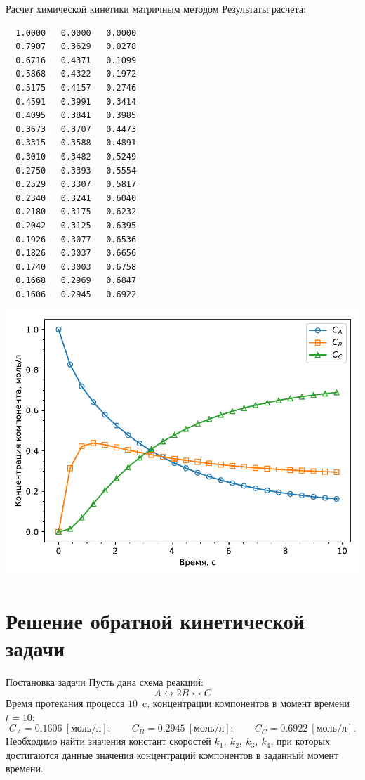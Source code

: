 \documentclass[aspectratio=169, mathserif]{beamer}	%
\begin{document}
\begin{frame}[fragile, label=c]{Расчет химической кинетики матричным методом}
\scriptsize
Результаты расчета:
\vfill
\begin{minipage}{.35\textwidth}
\begin{verbatim}
  1.0000   0.0000   0.0000
  0.7907   0.3629   0.0278
  0.6716   0.4371   0.1099
  0.5868   0.4322   0.1972
  0.5175   0.4157   0.2746
  0.4591   0.3991   0.3414
  0.4095   0.3841   0.3985
  0.3673   0.3707   0.4473
  0.3315   0.3588   0.4891
  0.3010   0.3482   0.5249
  0.2750   0.3393   0.5554
  0.2529   0.3307   0.5817
  0.2340   0.3241   0.6040
  0.2180   0.3175   0.6232
  0.2042   0.3125   0.6395
  0.1926   0.3077   0.6536
  0.1826   0.3037   0.6656
  0.1740   0.3003   0.6758
  0.1668   0.2969   0.6847
  0.1606   0.2945   0.6922
\end{verbatim}
\end{minipage}
\begin{minipage}{.64\textwidth}
\includegraphics[width=\linewidth]{./pics/fig}
\end{minipage}
\vfill
\end{frame}


\section{Решение обратной кинетической задачи}
\sectionframe

\begin{frame}[fragile, label=c]{Постановка задачи}
\scriptsize
Пусть дана схема реакций:
\vfill
$$
	A \longleftrightarrow 2B \longleftrightarrow C
$$
\vfill
Время протекания процесса $10$~$\mathrm{c}$, концентрации компонентов в момент времени $t = 10$:
\vfill
$$
	C_A = 0.1606 \ \left[\mathrm{моль/л}\right]; \qquad C_B = 0.2945 \ \left[\mathrm{моль/л}\right]; \qquad C_C = 0.6922 \ \left[\mathrm{моль/л}\right].
$$
\vfill
Необходимо найти значения констант скоростей $k_1, \ k_2, \ k_3, \ k_4$, при которых достигаются данные значения концентраций компонентов в заданный момент времени.
\vfill
\end{frame}
\end{document}
